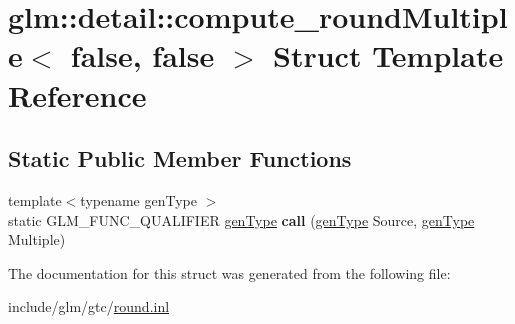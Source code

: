 \hypertarget{structglm_1_1detail_1_1compute__roundMultiple_3_01false_00_01false_01_4}{}\section{glm\+:\+:detail\+:\+:compute\+\_\+round\+Multiple$<$ false, false $>$ Struct Template Reference}
\label{structglm_1_1detail_1_1compute__roundMultiple_3_01false_00_01false_01_4}
\subsection*{Static Public Member Functions}
\begin{DoxyCompactItemize}
\item 
\mbox{\label{structglm_1_1detail_1_1compute__roundMultiple_3_01false_00_01false_01_4_a9242ffccd610779b8020ad382d47213a}} 
{\footnotesize template$<$typename gen\+Type $>$ }\\static G\+L\+M\+\_\+\+F\+U\+N\+C\+\_\+\+Q\+U\+A\+L\+I\+F\+I\+ER \hyperlink{structglm_1_1detail_1_1genType}{gen\+Type} {\bfseries call} (\hyperlink{structglm_1_1detail_1_1genType}{gen\+Type} Source, \hyperlink{structglm_1_1detail_1_1genType}{gen\+Type} Multiple)
\end{DoxyCompactItemize}


The documentation for this struct was generated from the following file\+:\begin{DoxyCompactItemize}
\item 
include/glm/gtc/\hyperlink{round_8inl}{round.\+inl}\end{DoxyCompactItemize}
